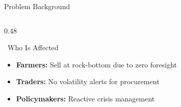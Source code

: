 \documentclass{beamer}
\begin{document}
\begin{frame}[label=bg]{Problem Background}
\begin{columns}[T]
\begin{column}{0.48\textwidth}
\vspace{0.02cm}

\begin{successcard}{~Who Is Affected}
\fontsize{6pt}{7pt}\selectfont
\begin{itemize}\setlength\itemsep{1pt}
  \item \textbf{Farmers:} Sell at rock-bottom due to zero foresight
  \item \textbf{Traders:} No volatility alerts for procurement
  \item \textbf{Policymakers:} Reactive crisis management
\end{itemize}
\end{successcard}

\end{column}
\end{columns}

\end{frame}
\end{document}
